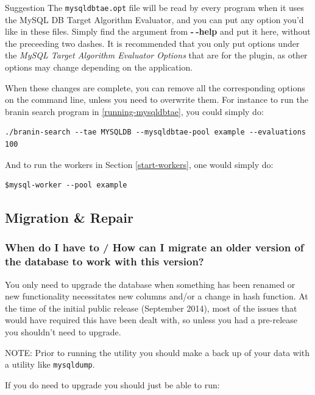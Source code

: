 \documentclass[11pt,letterpaper,oneside]{article}
\begin{document}
\begin{bclogo}[logo=\bclampe, couleurBarre=red, noborder=true]{Suggestion}
The \texttt{mysqldbtae.opt} file will be read by every program when it uses the MySQL DB Target Algorithm Evaluator, and you can put any option you'd like in these files. Simply find the argument from \textbf{-$~\!$-help} and put it here, without the preceeding two dashes. It is recommended that you only put options under the \textit{MySQL Target Algorithm Evaluator Options} that are for the plugin, as other options may change depending on the application.
\end{bclogo}

When these changes are complete, you can remove all the corresponding options on the command line, unless you need to overwrite them. For instance to run the branin search program in \ref{running-mysqldbtae}, you could simply do:

\begin{verbatim}
./branin-search --tae MYSQLDB --mysqldbtae-pool example --evaluations 100
\end{verbatim}


And to run the workers in Section \ref{start-workers}, one would simply do:
\begin{verbatim}
$mysql-worker --pool example  
\end{verbatim}


\subsection{Migration \& Repair}
\label{repair}

\subsubsection{When do I have to / How can I migrate an older version of the database to work with this version?}

You only need to upgrade the database when something has been renamed or new functionality necessitates new columns and/or a change in hash function. At the time of the initial public release (September 2014), most of the issues that would have required this have been dealt with, so unless you had a pre-release you shouldn't need to upgrade. 

\textsc{NOTE}: Prior to running the utility you should make a back up of your data with a utility like \texttt{mysqldump}.


If you do need to upgrade you should just be able to run:
\end{document}
